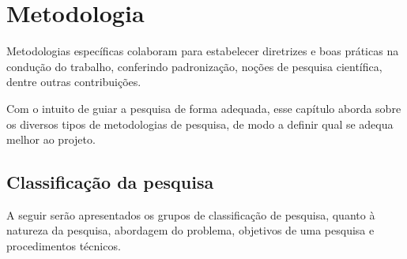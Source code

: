 \chapter{Metodologia}
Metodologias específicas colaboram para estabelecer diretrizes e boas práticas na condução do trabalho, conferindo padronização, noções de pesquisa científica, dentre outras contribuições. \cite{Wohlin:2000}

Com o intuito de guiar a pesquisa de forma adequada, esse capítulo aborda sobre os diversos tipos de metodologias de pesquisa, de modo a definir qual se adequa melhor ao projeto.


%
%
\section{Classificação da pesquisa}
A seguir serão apresentados os grupos de classificação de pesquisa, quanto à natureza da pesquisa, abordagem do problema, objetivos de uma pesquisa e procedimentos técnicos.

